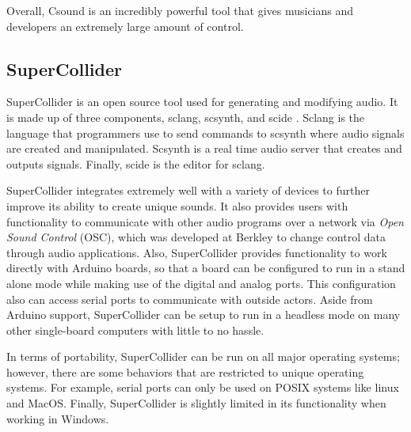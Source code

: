         Overall, Csound is an incredibly powerful tool that gives musicians and developers an extremely large amount of control.
    \subsection{SuperCollider}
        SuperCollider is an open source tool used for generating and modifying audio\cite{bib:sc}.
        It is made up of three components, sclang, scsynth, and scide \cite{bib:sc}.
        Sclang is the language that programmers use to send commands to scsynth where  audio signals are created and manipulated\cite{bib:sc}.
        Scsynth is a real time audio server that creates and outputs signals. Finally, scide is the editor for sclang\cite{bib:sc}. 
        
        SuperCollider integrates extremely well with a variety of devices to further improve its ability to create unique sounds\cite{bib:scB}.
        It also provides users with functionality to communicate with other audio programs over a network via \textit{Open Sound Control} (OSC), which was developed at Berkley to change control data through audio applications\cite{bib:scB}.
        Also, SuperCollider provides functionality to work directly with Arduino boards, so that a board can be configured to run in a stand alone mode while making use of the digital and analog ports.
        This configuration also can access serial ports to communicate with outside actors\cite{bib:scB}.
        Aside from Arduino support, SuperCollider can be setup to run in a headless mode on many other single-board computers with little to no hassle.
        
        
        In terms of portability, SuperCollider can be run on all major operating systems; however, there are some behaviors that are restricted to unique operating systems.
        For example, serial ports can only be used on POSIX systems like linux and MacOS\cite{bib:scB}.
        Finally, SuperCollider is slightly limited in its functionality when working in Windows.
        
        
        
